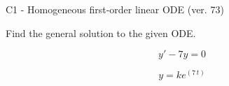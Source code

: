 \begin{exercise}
  \begin{exerciseTitle}C1 - Homogeneous first-order linear ODE (ver. 73)\end{exerciseTitle}
  \begin{exerciseStatement}
    
Find the general solution to the given ODE.

    
\[y'-7y=0\]

  \end{exerciseStatement}
  \begin{exerciseAnswer}
    
\[y= k e^{\left(7 \, t\right)}\]

  \end{exerciseAnswer}
\end{exercise}